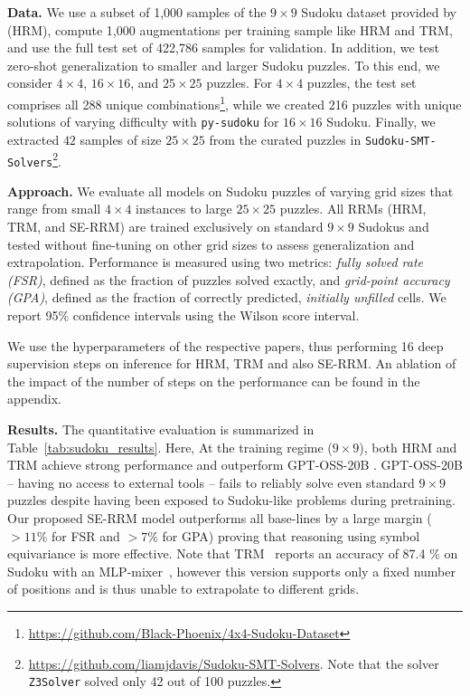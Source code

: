 \documentclass{article}
\theoremstyle{plain}
\theoremstyle{definition}
\theoremstyle{remark}
\renewcommand{\paragraph}[1]{\textbf{#1}\;}
\begin{document}
\paragraph{Data.} We use a subset of 1,000 samples of the $9\times9$ Sudoku dataset provided by \citet{wang2025hierarchical} (HRM), compute 1,000 augmentations per training sample like HRM and TRM, and use the full test set of 422,786 samples for validation.
In addition, we test zero-shot generalization to smaller and larger Sudoku puzzles.
To this end, we consider $4\times 4$, $16\times 16$, and $25\times 25$ puzzles.
For $4\times 4$ puzzles, the test set comprises all 288 unique combinations\footnote{\url{https://github.com/Black-Phoenix/4x4-Sudoku-Dataset}}, while we created 216 puzzles with unique solutions of varying difficulty with \texttt{py-sudoku} for $16\times16$ Sudoku.
Finally, we extracted $42$ samples of size $25\times 25$ from the curated puzzles in \texttt{Sudoku-SMT-Solvers}\footnote{\url{https://github.com/liamjdavis/Sudoku-SMT-Solvers}. Note that the solver \texttt{Z3Solver} solved only 42 out of 100 puzzles.}. 


\paragraph{Approach.} We evaluate all models on Sudoku puzzles of varying grid sizes that range from small $4\times4$ instances to large $25\times25$ puzzles. 
All RRMs (HRM, TRM, and SE-RRM) are trained exclusively on standard $9\times9$ Sudokus and tested without fine-tuning on other grid sizes to assess generalization and extrapolation. 
Performance is measured using two metrics: \emph{fully solved rate (FSR)}, defined as the fraction of puzzles solved exactly, and \emph{grid-point accuracy (GPA)}, defined as the fraction of correctly predicted, \emph{initially unfilled} cells. We report 95\% confidence intervals using the Wilson score interval. 

We use the hyperparameters of the respective papers, thus performing 16 deep supervision steps on inference for HRM, TRM and also SE-RRM. An ablation of the impact of the number of steps on the performance can be found in the appendix.


\paragraph{Results.} The quantitative evaluation is summarized in Table~\ref{tab:sudoku_results}.
Here, 
At the training regime ($9\times9$), both HRM and TRM achieve strong performance and outperform GPT-OSS-20B \citep{agarwal2025gpt}.
GPT-OSS-20B -- having no access to external tools -- fails to reliably solve even standard $9\times9$ puzzles despite having been exposed to Sudoku-like problems during pretraining.
Our proposed SE-RRM model outperforms all base-lines by a large margin ($>11\%$ for FSR and $>7\%$ for GPA) proving that reasoning using symbol equivariance is more effective.
Note that TRM~\citep{jolicoeur2025less} reports an accuracy of 87.4 \% on Sudoku with an MLP-mixer~\cite{tolstikhin2021mlp}, however this version supports only a fixed number of positions and is thus unable to extrapolate to different grids.
\end{document}
